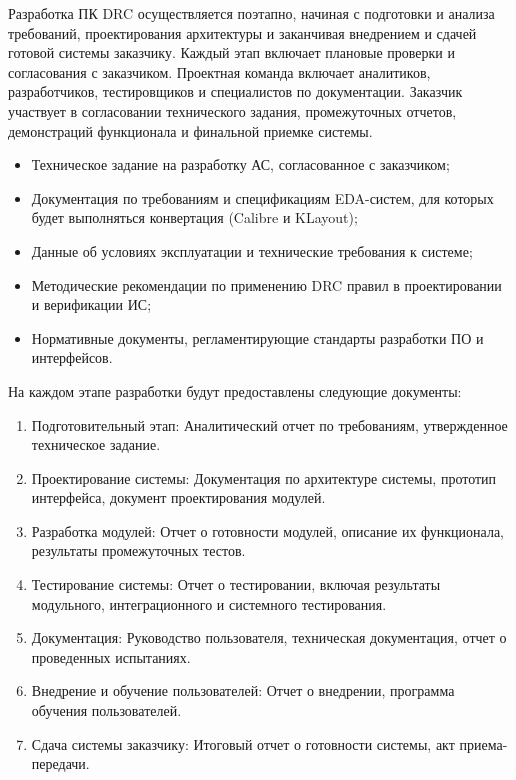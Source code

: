 

Разработка ПК DRC осуществляется поэтапно,
начиная с подготовки и анализа требований,
проектирования архитектуры и заканчивая внедрением
и сдачей готовой системы заказчику.
Каждый этап включает плановые проверки и согласования с заказчиком.
Проектная команда включает аналитиков, разработчиков,
тестировщиков и специалистов по документации.
Заказчик участвует в согласовании технического задания,
промежуточных отчетов, демонстраций функционала и финальной приемке системы.


\begin{itemize}
	\item Техническое задание на разработку АС, согласованное с заказчиком;
	\item Документация по требованиям и спецификациям EDA-систем,
		для которых будет выполняться конвертация (Calibre и KLayout);
	\item Данные об условиях эксплуатации и технические требования к системе;
	\item Методические рекомендации по применению DRC правил
		в проектировании и верификации ИС;
	\item Нормативные документы,
		регламентирующие стандарты разработки ПО и интерфейсов.
\end{itemize}


На каждом этапе разработки будут предоставлены следующие документы:

\begin{enumerate}
	\item Подготовительный этап:
		Аналитический отчет по требованиям, утвержденное техническое задание.
	\item Проектирование системы:
		Документация по архитектуре системы,
		прототип интерфейса, документ проектирования модулей.
	\item Разработка модулей:
		Отчет о готовности модулей, описание их функционала,
		результаты промежуточных тестов.
	\item Тестирование системы:
		Отчет о тестировании, включая результаты модульного,
		интеграционного и системного тестирования.
	\item Документация:
		Руководство пользователя, техническая документация,
		отчет о проведенных испытаниях.
	\item Внедрение и обучение пользователей:
		Отчет о внедрении, программа обучения пользователей.
	\item Сдача системы заказчику:
		Итоговый отчет о готовности системы, акт приема-передачи.
\end{enumerate}

